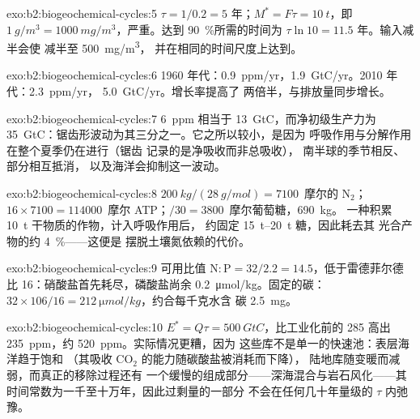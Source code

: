 \begin{solution}{exo:b2:biogeochemical-cycles:5}
$\tau = 1/0.2 = 5$ 年；$M^{*} = F\tau = \qty{10}{t}$，即
$\qty{1}{g/m^3} = \qty{1000}{mg/m^3}$，严重。达到
\qty{90}{\%}所需的时间为 $\tau\ln 10 = 11.5$ 年。输入减半会使
减半至 \qty{500}{mg/m^3}，
并在相同的时间尺度上达到。
\end{solution}

\begin{solution}{exo:b2:biogeochemical-cycles:6}
1960 年代：\qty{0.9}{ppm/yr}，\qty{1.9}{GtC/yr}。2010 年代：\qty{2.3}{ppm/yr}，
\qty{5.0}{GtC/yr}。增长率提高了
两倍半，与排放量同步增长。
\end{solution}

\begin{solution}{exo:b2:biogeochemical-cycles:7}
\qty{6}{ppm} 相当于 \qty{13}{GtC}，而净初级生产力为
\qty{35}{GtC}：锯齿形波动为其三分之一。它之所以较小，是因为
呼吸作用与分解作用在整个夏季仍在进行（锯齿
记录的是净吸收而非总吸收），
南半球的季节相反、部分相互抵消，
以及海洋会抑制这一波动。
\end{solution}

\begin{solution}{exo:b2:biogeochemical-cycles:8}
$\qty{200}{kg}/(\qty{28}{g/mol}) = 7100$~摩尔的 $\mathrm{N_2}$；$16\times
7100 = \num{114000}$~摩尔 ATP；$/30 = 3800$~摩尔葡萄糖，\qty{690}{kg}。
一种积累 \qty{10}{t} 干物质的作物，计入呼吸作用后，
约固定 \qtyrange{15}{20}{t} 糖，因此耗去其
光合产物的约 \qty{4}{\%}——这便是
摆脱土壤氮依赖的代价。
\end{solution}

\begin{solution}{exo:b2:biogeochemical-cycles:9}
可用比值 $\mathrm{N:P} = 32/2.2 = 14.5$，低于雷德菲尔德比
16：硝酸盐首先耗尽，磷酸盐尚余
\qty{0.2}{\micro mol/kg}。固定的碳：$32\times 106/16 =
\qty{212}{\micro mol/kg}$，约合每千克水含
碳 \qty{2.5}{mg}。
\end{solution}

\begin{solution}{exo:b2:biogeochemical-cycles:10}
$E^{*} = Q\tau = \qty{500}{GtC}$，比工业化前的 285
高出 \qty{235}{ppm}，约 \qty{520}{ppm}。实际情况更糟，因为
这些库不是单一的快速池：表层海洋趋于饱和
（其吸收 $\mathrm{CO_2}$ 的能力随碳酸盐被消耗而下降），
陆地库随变暖而减弱，而真正的移除过程还有
一个缓慢的组成部分——深海混合与岩石风化——其
时间常数为一千至十万年，因此过剩量的一部分
不会在任何几十年量级的 $\tau$ 内弛豫。
\end{solution}

